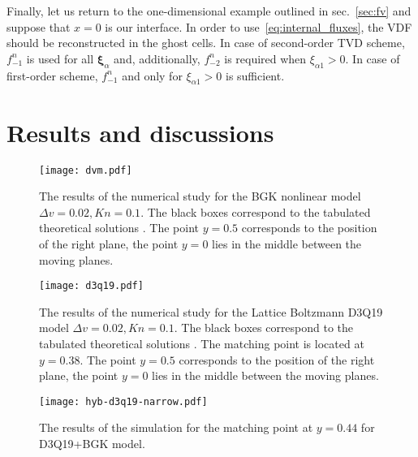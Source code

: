 \documentclass[]{elsarticle} %
\newcommand{\bxi}{{\boldsymbol{\xi}}}
\newcommand{\bxia}{\bxi_\alpha}
\begin{document}
{%
Finally, let us return to the one-dimensional example outlined in sec.~\ref{sec:fv}
and suppose that \(x=0\) is our interface.
In order to use~\eqref{eq:internal_fluxes}, the VDF should be reconstructed in the ghost cells.
In case of second-order TVD scheme, \(f_{-1}^n\) is used for all \(\bxia\) and, additionally,
\(f_{-2}^n\) is required when \(\xi_{\alpha1}>0\).
In case of first-order scheme, \(f_{-1}^n\) and only for \(\xi_{\alpha1}>0\) is sufficient.

\section{Results and discussions}\label{sec:results}

\begin{figure}[!h]
\centering
\texttt{[image: dvm.pdf]}
\caption{The  results of the  numerical study for the BGK nonlinear model $\Delta v=0.02, Kn=0.1$. The  black boxes correspond  to the  tabulated theoretical solutions \cite{Luo2015, Luo2016}. The  point $y=0.5$ corresponds  to the position of the right plane, the point $y=0$ lies in the middle between the moving planes.}
\end{figure}


\begin{figure}[!h]
\centering
\texttt{[image: d3q19.pdf]}
\caption{The  results of the  numerical study for the Lattice Boltzmann D3Q19 model $\Delta v=0.02, Kn=0.1$. The  black boxes correspond  to the  tabulated theoretical solutions \cite{Luo2015, Luo2016}.  The  matching  point is  located at $y=0.38$. The  point $y=0.5$ corresponds  to the position of the right plane, the point $y=0$ lies in the middle between the moving planes.}
\end{figure}

\begin{figure}[!h]
\centering
\texttt{[image: hyb-d3q19-narrow.pdf]}
\caption{The  results of the simulation for the matching point at $y=0.44$ for D3Q19+BGK model.}
\end{figure}

}
\end{document}
